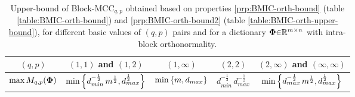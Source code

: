\begin{table*}[tp]
\begin{adjustbox}{width=1\textwidth} %
\centering
\begin{tabular}{ccccc}
\toprule
\multicolumn{1}{c}{$(q,p)$} &\multicolumn{1}{c}{$(1,1)$ and $(1,2)$} & \multicolumn{1}{c}{$(1,\infty)$} & \multicolumn{1}{c}{$(2,2)$} & \multicolumn{1}{c}{$(2,\infty)$ and $(\infty,\infty)$} \\ \midrule %
\multicolumn{1}{l}{$\max M_{q,p}(\boldsymbol{\Phi})$} &\multicolumn{1}{l}{$\min \left\lbrace d_{min}^{-\frac12} \, m^{\frac12} , d_{max}^{\frac12} \right\rbrace$} & \multicolumn{1}{c}{$\min \left\lbrace m , d_{max} \right\rbrace$} &\multicolumn{1}{c}{$d_{min}^{-\frac12} \, d_{max}^{-\frac12}$}  &\multicolumn{1}{c}{$\min \left\lbrace d_{max}^{-\frac12} \, m^{\frac12} , d_{max}^{\frac12} \right\rbrace$} \\ %
\bottomrule
\end{tabular}
\end{adjustbox}
\caption{Upper-bound of Block-MCC$_{q,p}$ obtained based on properties \ref{prp:BMIC-orth-bound} (table \ref{table:BMIC-orth-bound}) and \ref{prp:BMIC-orth-bound2} (table \ref{table:BMIC-orth-upper-bound}), for different basic values of $(q,p)$ pairs and for a dictionary $\boldsymbol{\Phi} {\in} \mathbb{R}^{m {\times} n}$ with intra-block orthonormality.}
\label{table:BMIC-orth-bound-min}
\end{table*}